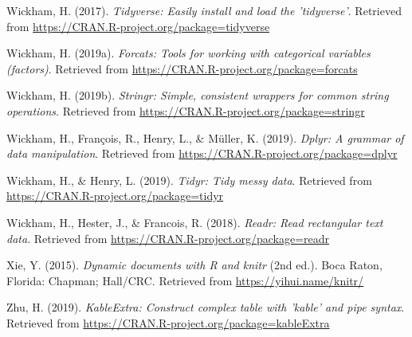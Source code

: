 \documentclass[man]{apa6}
\begin{document}
\leavevmode\hypertarget{ref-R-tidyverse}{}%
Wickham, H. (2017). \emph{Tidyverse: Easily install and load the 'tidyverse'}. Retrieved from \url{https://CRAN.R-project.org/package=tidyverse}

\leavevmode\hypertarget{ref-R-forcats}{}%
Wickham, H. (2019a). \emph{Forcats: Tools for working with categorical variables (factors)}. Retrieved from \url{https://CRAN.R-project.org/package=forcats}

\leavevmode\hypertarget{ref-R-stringr}{}%
Wickham, H. (2019b). \emph{Stringr: Simple, consistent wrappers for common string operations}. Retrieved from \url{https://CRAN.R-project.org/package=stringr}

\leavevmode\hypertarget{ref-R-dplyr}{}%
Wickham, H., François, R., Henry, L., \& Müller, K. (2019). \emph{Dplyr: A grammar of data manipulation}. Retrieved from \url{https://CRAN.R-project.org/package=dplyr}

\leavevmode\hypertarget{ref-R-tidyr}{}%
Wickham, H., \& Henry, L. (2019). \emph{Tidyr: Tidy messy data}. Retrieved from \url{https://CRAN.R-project.org/package=tidyr}

\leavevmode\hypertarget{ref-R-readr}{}%
Wickham, H., Hester, J., \& Francois, R. (2018). \emph{Readr: Read rectangular text data}. Retrieved from \url{https://CRAN.R-project.org/package=readr}

\leavevmode\hypertarget{ref-R-knitr}{}%
Xie, Y. (2015). \emph{Dynamic documents with R and knitr} (2nd ed.). Boca Raton, Florida: Chapman; Hall/CRC. Retrieved from \url{https://yihui.name/knitr/}

\leavevmode\hypertarget{ref-R-kableExtra}{}%
Zhu, H. (2019). \emph{KableExtra: Construct complex table with 'kable' and pipe syntax}. Retrieved from \url{https://CRAN.R-project.org/package=kableExtra}

\endgroup
\end{document}
